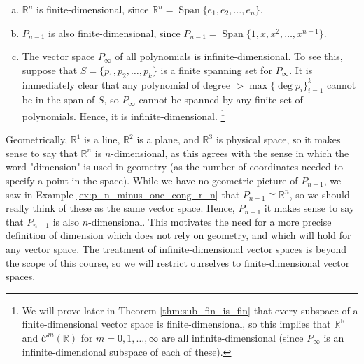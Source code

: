 \documentclass[12pt,letterpaper,reqno]{article}
\numberwithin{equation}{section}
\newcommand{\R}{\ensuremath{\mathbb R}}
\DeclareMathOperator{\Span}{Span}
\begin{document}
\begin{example}
\begin{enumerate}[(a)]\hspace{15cm}
	\item $\mathbb{R}^n$ is finite-dimensional, since $\mathbb{R}^n=\Span\{e_1,e_2,\dots,e_n\}$.
	\item $P_{n-1}$ is also finite-dimensional, since $P_{n-1}=\Span\{1,x,x^2,\dots,x^{n-1}\}$.
	\item The vector space $P_\infty$ of all polynomials is infinite-dimensional. To see this, suppose that $S=\{p_1,p_2,\dots,p_k\}$ is a finite spanning set for $P_\infty$. It is immediately clear that any polynomial of degree $> \max\{\deg p_i\}_{i=1}^k$ cannot be in the span of $S$, so $P_\infty$ cannot be spanned by any finite set of polynomials. Hence, it is infinite-dimensional. \footnote{We will prove later in Theorem \ref{thm:sub_fin_is_fin} that every subspace of a finite-dimensional vector space is finite-dimensional, so this implies that $\R^\R$ and $\mathscr{C}^{m}(\R)$ for $m=0,1,\dots,\infty$ are all infinite-dimensional (since $P_\infty$ is an infinite-dimensional subspace of each of these).}
\end{enumerate}	
\end{example}

Geometrically, $\R^1$ is a line, $\R^2$ is a plane, and $\R^3$ is physical space, so it makes sense to say that $\R^n$ is $n$-dimensional, as this agrees with the sense in which the word "dimension" is used in geometry (as the number of coordinates needed to specify a point in the space). While we have no geometric picture of $P_{n-1}$, we saw in Example \ref{ex:p_n_minus_one_cong_r_n} that $P_{n-1} \cong \R^n$, so we should really think of these as the same vector space. Hence, $P_{n-1}$ it makes sense to say that $P_{n-1}$ is also $n$-dimensional. This motivates the need for a more precise definition of dimension which does not rely on geometry, and which will hold for any vector space. The treatment of infinite-dimensional vector spaces is beyond the scope of this course, so we will restrict ourselves to finite-dimensional vector spaces.
\end{document}
